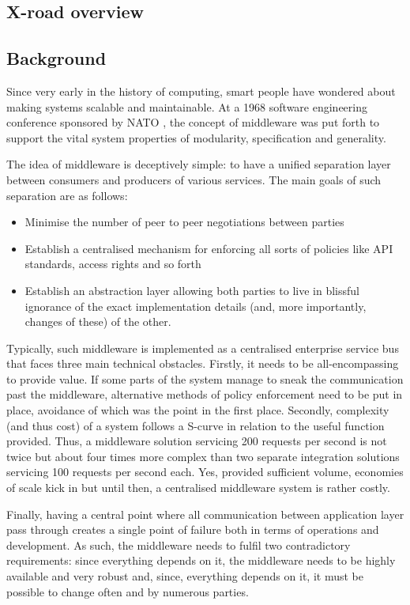 \documentclass[10pt,a4paper]{article}
\begin{document}
\clearpage
\begin{appendices}
\section{X-road overview}
\subsection{Background}
Since very early in the history of computing, smart people have wondered about making systems scalable and maintainable. At a 1968 software engineering conference sponsored by NATO \citep{naur1969software}, the concept of middleware was put forth to support the vital system properties of modularity, specification and generality.

The idea of middleware is deceptively simple: to have a unified separation layer between consumers and producers of various services. The main goals of such separation are as follows:
\begin{itemize}
	\item Minimise the number of peer to peer negotiations between parties 
	\item Establish a centralised mechanism for enforcing all sorts of policies like API standards, access rights and so forth
	\item Establish an abstraction layer allowing both parties to live in blissful ignorance of the exact implementation details (and, more importantly, changes of these) of the other. 
\end{itemize}

Typically, such middleware is implemented as a centralised enterprise service bus that faces three main technical obstacles. Firstly, it needs to be all-encompassing to provide value. If some parts of the system manage to sneak the communication past the middleware, alternative methods of policy enforcement need to be put in place, avoidance of which was the point in the first place. Secondly, complexity (and thus cost) of a system follows a S-curve  in relation to the useful function provided. Thus, a middleware solution servicing 200 requests per second is not twice but about four times more complex than two separate integration solutions servicing 100 requests per second each. Yes, provided sufficient volume, economies of scale kick in but until then, a centralised middleware system is rather costly.

Finally, having a central point where all communication between application layer pass through creates a single point of failure both in terms of operations and development. As such, the middleware needs to fulfil two contradictory requirements: since everything depends on it, the middleware needs to be highly available and very robust and, since, everything depends on it, it must be possible to change often and by numerous parties. 


\end{appendices}
\end{document}
